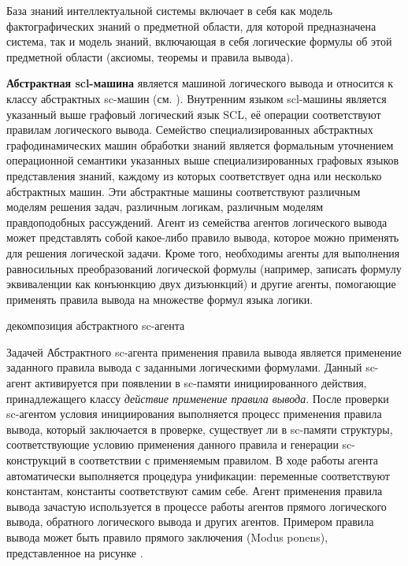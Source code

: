 База знаний интеллектуальной системы включает в себя как модель фактографических знаний о предметной области, для которой предназначена система, так и модель знаний, включающая в себя логические формулы об этой предметной области (аксиомы, теоремы и правила вывода).

\textbf{Абстрактная scl-машина} является машиной логического вывода и относится к классу абстрактных sc-машин (см. ). Внутренним языком scl-машины является указанный выше графовый логический язык SCL, её операции соответствуют правилам логического вывода. Семейство специализированных абстрактных графодинамических машин обработки знаний является формальным уточнением операционной семантики указанных выше специализированных графовых языков представления знаний, каждому из которых соответствует одна или несколько абстрактных машин. Эти абстрактные машины соответствуют различным моделям решения задач, различным логикам, различным моделям правдоподобных рассуждений. 
Агент из семейства агентов логического вывода может представлять собой какое-либо правило вывода, которое можно применять для решения логической задачи. Кроме того, необходимы агенты для выполнения равносильных преобразований логической формулы (например, записать формулу эквиваленции как конъюнкцию двух дизъюнкций) и другие агенты, помогающие применять правила вывода на множестве формул языка логики.

\begin{SCn}
	\begin{scnrelfromset}{декомпозиция абстрактного sc-агента}
	\end{scnrelfromset}
\end{SCn}

Задачей Абстрактного sc-агента применения правила вывода является применение заданного правила вывода с заданными логическими формулами. Данный sc-агент активируется при появлении в sc-памяти инициированного действия, принадлежащего классу \textit{действие применение правила вывода}. После проверки sc-агентом условия инициирования выполняется процесс применения правила вывода, который заключается в  проверке, существует ли в sc-памяти структуры, соответствующие условию применения данного правила и генерации sc-конструкций в соответствии с применяемым правилом. В ходе работы агента автоматически выполняется процедура унификации: переменные соответствуют константам, константы соответствуют самим себе. Агент применения правила вывода зачастую используется в процессе работы агентов прямого логического вывода, обратного логического вывода и других агентов. Примером правила вывода может быть правило прямого заключения (Modus ponens), представленное на рисунке .

